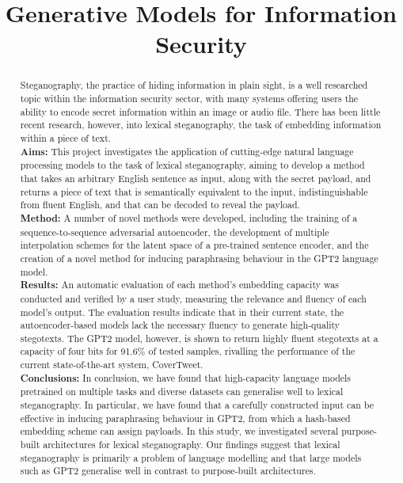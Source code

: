 \documentclass[12pt,a4paper]{article}
\title{Generative Models for Information Security}
\author{} %
\date{}
\begin{document}
\maketitle

\begin{abstract}

 Steganography, the practice of hiding information in plain sight, is a well researched topic within the information security sector, with many systems offering users the ability to encode secret information within an image or audio file. There has been little recent research, however, into lexical steganography, the task of embedding information within a piece of text.
\\
{\bf Aims:} This project investigates the application of cutting-edge natural language processing models to the task of lexical steganography, aiming to develop a method that takes an arbitrary English sentence as input, along with the secret payload, and returns a piece of text that is semantically equivalent to the input, indistinguishable from fluent English, and that can be decoded to reveal the payload.
\\
{\bf Method:} 
A number of novel methods were developed, including the training of a sequence-to-sequence adversarial autoencoder, the development of multiple interpolation schemes for the latent space of a pre-trained sentence encoder, and the creation of a novel method for inducing paraphrasing behaviour in the GPT2 language model.\\
{\bf Results:} 
An automatic evaluation of each method's embedding capacity was conducted and verified by a user study, measuring the relevance and fluency of each model's output. The evaluation results indicate that in their current state, the autoencoder-based models lack the necessary fluency to generate high-quality stegotexts. The GPT2 model, however, is shown to return highly fluent stegotexts at a capacity of four bits for 91.6\% of tested samples, rivalling the performance of the current state-of-the-art system, CoverTweet.
\\
{\bf Conclusions:} 
In conclusion, we have found that high-capacity language models pretrained on multiple tasks and diverse datasets can generalise well to lexical steganography. In particular, we have found that a carefully constructed input can be effective in inducing paraphrasing behaviour in GPT2, from which a hash-based embedding scheme can assign payloads. In this study, we investigated several purpose-built architectures for lexical steganography. Our findings suggest that lexical steganography is primarily a problem of language modelling and that large models such as GPT2 generalise well in contrast to purpose-built architectures.
\end{abstract}
\end{document}
